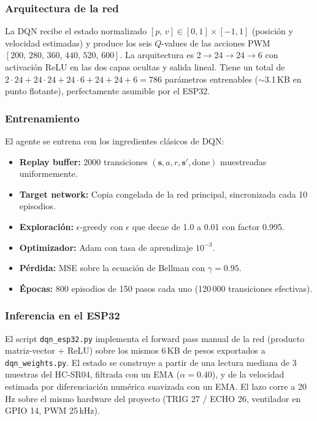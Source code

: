 \documentclass[conference]{IEEEtran}
\begin{document}
\subsubsection{Arquitectura de la red}

La DQN recibe el estado normalizado $[p,\,v] \in [0,1]\times[-1,1]$ (posición y velocidad estimadas) y produce los seis $Q$-values de las acciones PWM $[200,\,280,\,360,\,440,\,520,\,600]$. La arquitectura es 2$\to$24$\to$24$\to$6 con activación ReLU en las dos capas ocultas y salida lineal. Tiene un total de $2\!\cdot\!24 + 24\!\cdot\!24 + 24\!\cdot\!6 + 24 + 24 + 6 = 786$ parámetros entrenables ($\sim$3.1\,KB en punto flotante), perfectamente asumible por el ESP32.

\subsubsection{Entrenamiento}

El agente se entrena con los ingredientes clásicos de DQN:
\begin{itemize}
    \item \textbf{Replay buffer:} 2000 transiciones $(\mathbf{s},a,r,\mathbf{s}',\text{done})$ muestreadas uniformemente.
    \item \textbf{Target network:} Copia congelada de la red principal, sincronizada cada 10 episodios.
    \item \textbf{Exploración:} $\epsilon$-greedy con $\epsilon$ que decae de 1.0 a 0.01 con factor 0.995.
    \item \textbf{Optimizador:} Adam con tasa de aprendizaje $10^{-3}$.
    \item \textbf{Pérdida:} MSE sobre la ecuación de Bellman con $\gamma = 0.95$.
    \item \textbf{Épocas:} 800 episodios de 150 pasos cada uno (120\,000 transiciones efectivas).
\end{itemize}

\subsubsection{Inferencia en el ESP32}

El script \texttt{dqn\_esp32.py} implementa el forward pass manual de la red (producto matriz-vector + ReLU) sobre los mismos 6\,KB de pesos exportados a \texttt{dqn\_weights.py}. El estado se construye a partir de una lectura mediana de 3 muestras del HC-SR04, filtrada con un EMA ($\alpha = 0.40$), y de la velocidad estimada por diferenciación numérica suavizada con un EMA. El lazo corre a 20\,Hz sobre el mismo hardware del proyecto (TRIG 27 / ECHO 26, ventilador en GPIO 14, PWM 25\,kHz).
\end{document}
